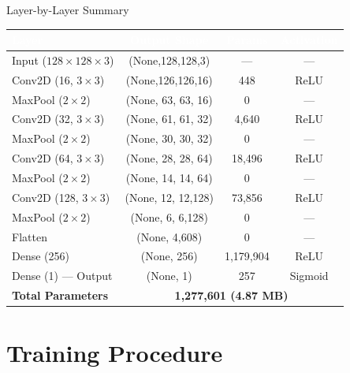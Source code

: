 \documentclass[aspectratio=169,11pt]{beamer}
\begin{document}
\begin{frame}{Layer-by-Layer Summary}
  \centering
  \renewcommand{\arraystretch}{1.25}
  {\small
  \begin{tabular}{|l|c|c|c|}
  \hline
  \rowcolor{black}
  \textcolor{white}{\textbf{Layer}} &
  \textcolor{white}{\textbf{Output Shape}} &
  \textcolor{white}{\textbf{Params}} &
  \textcolor{white}{\textbf{Activation}} \\
  \hline
  Input ($128\times128\times3$)    & (None,128,128,3)   & ---           & --- \\
  \hline
  Conv2D (16, $3\times3$)          & (None,126,126,16)  & 448           & ReLU \\
  MaxPool ($2\times2$)             & (None, 63, 63, 16) & 0             & --- \\
  \hline
  Conv2D (32, $3\times3$)          & (None, 61, 61, 32) & 4{,}640       & ReLU \\
  MaxPool ($2\times2$)             & (None, 30, 30, 32) & 0             & --- \\
  \hline
  Conv2D (64, $3\times3$)          & (None, 28, 28, 64) & 18{,}496      & ReLU \\
  MaxPool ($2\times2$)             & (None, 14, 14, 64) & 0             & --- \\
  \hline
  Conv2D (128, $3\times3$)         & (None, 12, 12,128) & 73{,}856      & ReLU \\
  MaxPool ($2\times2$)             & (None,  6,  6,128) & 0             & --- \\
  \hline
  Flatten                          & (None, 4{,}608)    & 0             & --- \\
  Dense (256)                      & (None, 256)        & 1{,}179{,}904 & ReLU \\
  Dense (1) --- Output             & (None, 1)          & 257           & Sigmoid \\
  \hline
  \rowcolor{gray!15}
  \textbf{Total Parameters}        & \multicolumn{3}{c|}{\textbf{1{,}277{,}601 \quad (4.87 MB)}} \\
  \hline
  \end{tabular}}
\end{frame}

\section{Training Procedure}
\end{document}
